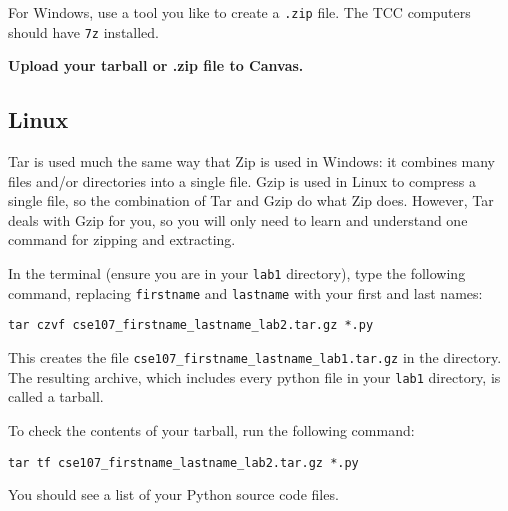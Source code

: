\documentclass[11pt,hidelinks]{article}
\begin{document}
For Windows, use a tool you like to create a \texttt{.zip} file. The TCC computers should
have \texttt{7z} installed.

\begin{center}
  \textbf{Upload your tarball or .zip file to Canvas.}
\end{center}

\subsection{Linux}

Tar is used much the same way that Zip is used in Windows: it combines many files and/or directories into a single file. Gzip is used in Linux to compress a single file, so the combination of Tar and Gzip do what Zip does. However, Tar deals with Gzip for you, so you will only need to learn and understand one command for zipping and extracting.

In the terminal (ensure you are in your \texttt{lab1} directory), type the following command, replacing \texttt{firstname} and \texttt{lastname} with your first and last names:

\begin{lstlisting}[style=bash]
tar czvf cse107_firstname_lastname_lab2.tar.gz *.py
\end{lstlisting}

This creates the file \texttt{cse107\_firstname\_lastname\_lab1.tar.gz} in the directory. The resulting archive, which includes every python file in your \texttt{lab1} directory, is called a tarball. 

To check the contents of your tarball, run the following command:

\begin{lstlisting}[style=bash]
tar tf cse107_firstname_lastname_lab2.tar.gz *.py
\end{lstlisting}

You should see a list of your Python source code files.
\end{document}
